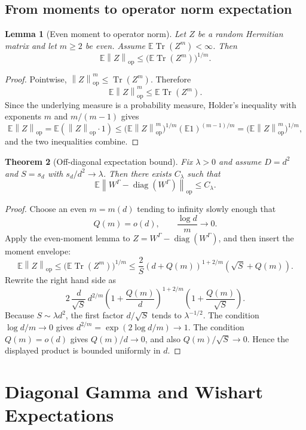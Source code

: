 \documentclass[11pt,oneside]{book}
\newtheorem{theorem}{Theorem}[chapter]
\newtheorem{lemma}[theorem]{Lemma}
\DeclareMathOperator{\Tr}{Tr}
\DeclareMathOperator{\diag}{diag}
\newcommand{\E}{\mathbb E}
\newcommand{\1}{\mathbf 1}
\newcommand{\pt}{\Gamma}
\newcommand{\op}{\mathrm{op}}
\newcommand{\norm}[1]{\left\|#1\right\|}
\begin{document}
\section{From moments to operator norm expectation}

\begin{lemma}[Even moment to operator norm]
Let \(Z\) be a random Hermitian matrix and let \(m\ge2\) be even.  Assume
\(\E\Tr(Z^m)<\infty\).  Then
\[
  \E\norm Z_{\op}\le \bigl(\E\Tr(Z^m)\bigr)^{1/m}.
\]
\end{lemma}

\begin{proof}
Pointwise, \(\norm Z_{\op}^m\le\Tr(Z^m)\).  Therefore
\[
  \E\norm Z_{\op}^m\le \E\Tr(Z^m).
\]
Since the underlying measure is a probability measure, Holder's inequality
with exponents \(m\) and \(m/(m-1)\) gives
\[
  \E\norm Z_{\op}
  =
  \E(\norm Z_{\op}\cdot 1)
  \le
  \bigl(\E\norm Z_{\op}^m\bigr)^{1/m}(\E 1)^{(m-1)/m}
  =
  \bigl(\E\norm Z_{\op}^m\bigr)^{1/m},
\]
and the two inequalities combine.
\end{proof}

\begin{theorem}[Off-diagonal expectation bound]
Fix \(\lambda>0\) and assume \(D=d^2\) and \(S=s_d\) with
\(s_d/d^2\to\lambda\).  Then there exists \(C_\lambda\) such that
\[
  \E\norm{W^\pt-\diag(W^\pt)}_{\op}\le C_\lambda .
\]
\end{theorem}

\begin{proof}
Choose an even \(m=m(d)\) tending to infinity slowly enough that
\[
  Q(m)=o(d),\qquad \frac{\log d}{m}\to0.
\]
Apply the even-moment lemma to \(Z=W^\pt-\diag(W^\pt)\), and then insert the
moment envelope:
\[
  \E\norm Z_{\op}
  \le \bigl(\E\Tr(Z^m)\bigr)^{1/m}
  \le
  \frac2S(d+Q(m))^{1+2/m}(\sqrt S+Q(m)).
\]
Rewrite the right hand side as
\[
  2\,\frac d{\sqrt S}\,
  d^{2/m}
  \left(1+\frac{Q(m)}d\right)^{1+2/m}
  \left(1+\frac{Q(m)}{\sqrt S}\right).
\]
Because \(S\sim\lambda d^2\), the first factor \(d/\sqrt S\) tends to
\(\lambda^{-1/2}\).  The condition \(\log d/m\to0\) gives
\(d^{2/m}=\exp(2\log d/m)\to1\).  The condition \(Q(m)=o(d)\) gives
\(Q(m)/d\to0\), and also \(Q(m)/\sqrt S\to0\).  Hence the displayed product is
bounded uniformly in \(d\).
\end{proof}

\chapter{Diagonal Gamma and Wishart Expectations}
\end{document}
